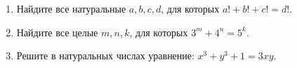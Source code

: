 \documentclass{article}
\begin{document}
\begin{enumerate}[label*=\protect\fbox{\arabic{enumi}}]
\item Найдите все натуральные $a, b, c, d$, для которых $a!+b!+c! = d!$.

\item Найдите все целые $m, n, k$, для которых $3^m + 4^n = 5^k$.

\item Решите в натуральных числах уравнение:  $x^3 + y^3 + 1 = 3xy$.


	

\end{enumerate}
\end{document}
